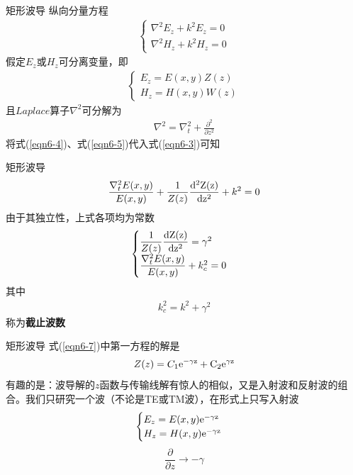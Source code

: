\begin{frame}{矩形波导}
    纵向分量方程
    \begin{align}
        \begin{cases}
            \nabla^2E_z+k^2E_z=0 \\
            \nabla^2H_z+k^2H_z=0
        \end{cases}
        \label{eqn6-3}
    \end{align}
    假定$E_z$或$H_z$可分离变量，即
    \begin{align}
        \begin{cases}
            E_z=E(x,y)Z(z) \\
            H_z=H(x,y)W(z)
        \end{cases}
        \label{eqn6-4}
    \end{align}
    且$Laplace$算子$\nabla^2$可分解为
    \begin{align}
        \nabla^2=\nabla_t^2+\frac{\partial^2}{\partial z^2}
        \label{eqn6-5}
    \end{align}
    将式(\ref{eqn6-4})、式(\ref{eqn6-5})代入式(\ref{eqn6-3})可知
\end{frame}

\begin{frame}{矩形波导}
    \begin{align}
        \frac{\nabla^2_t E(x,y)}{E(x,y)}+\frac{1}{Z(z)}\frac{\rm{d}^2 Z(z)}{\rm{d}z^2}+k^2=0
        \label{eqn6-6}
    \end{align}
    由于其独立性，上式各项均为常数
    \begin{align}
        \begin{cases}
            \dfrac{1}{Z(z)}\dfrac{\rm{d}Z(z)}{\rm{d}z^2}=\gamma^2 \\
            \dfrac{\nabla_t^2E(x,y)}{E(x,y)}+k_c^2=0
        \end{cases}
        \label{eqn6-7}
    \end{align}
    其中
    \begin{align}
        k_c^2=k^2+\gamma^2
    \end{align}
    称为\textbf{截止波数}
\end{frame}

\begin{frame}{矩形波导}
    式(\ref{eqn6-7})中第一方程的解是
    \begin{align}
        Z(z)=C_1\rm{e}^{-\gamma z}+C_2\rm{e}^{\gamma z}
    \end{align}
    有趣的是：波导解的$z$函数与传输线解有惊人的相似，又是入射波和反射波的组合。我们只研究一个波（不论是TE或TM波），在形式上只写入射波
    \begin{align}
        \begin{cases}
            E_z=E(x,y)\rm{e}^{-\gamma z} \\
            H_z=H(x,y)\rm{e}^{-\gamma z}
        \end{cases}
    \end{align}
    $$\frac{\partial}{\partial z}\rightarrow -\gamma$$ 
\end{frame}

